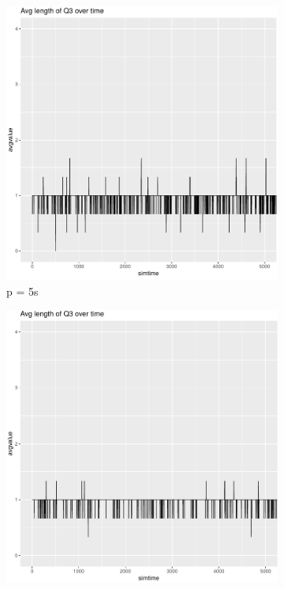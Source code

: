 \documentclass[a4paper,11pt]{article}
\begin{document}
\begin{figure}[h!]
\begin{subfigure}{.5\textwidth}
  \centering
  \includegraphics[width=.9\linewidth]{images/chart-q3avglength-5.png}
  \caption{p = 5s}
  \label{fig:sfig1}
\end{subfigure}%
\begin{subfigure}{.5\textwidth}
  \centering
  \includegraphics[width=.9\linewidth]{images/chart-q3avglength-75.png}

\end{subfigure}
\end{figure}
\end{document}
